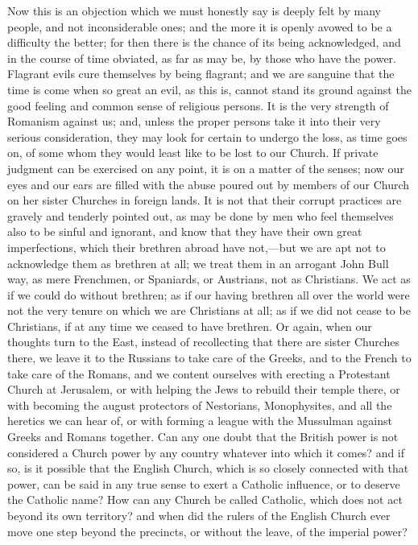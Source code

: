 Now this is an objection which we must honestly say is deeply felt
by many people, and not inconsiderable ones; and the more it is openly
avowed to be a difficulty the better; for then there is the chance of
its being acknowledged, and in the course of time obviated, as far as
may be, by those who have the power. Flagrant evils cure themselves by
being flagrant; and we are sanguine that the time is come when so
great an evil, as this is, cannot stand its ground against the good
feeling and common sense of religious persons. It is the very strength
of Romanism against us; and, unless the proper persons take it into
their very serious consideration, they may look for certain to undergo
the loss, as time goes on, of some whom they would least like to be
lost to our Church. If private judgment can be exercised on any point,
it is on a matter of the senses; now our eyes and our ears are filled
with the abuse poured out by members of our Church on her sister
Churches in foreign lands. It is not that their corrupt practices are
gravely and tenderly pointed out, as may be done by men who feel
themselves also to be sinful and ignorant, and know that they have
their own great imperfections, which their brethren abroad have not,—but
we are apt not to acknowledge them as brethren at all; we treat them
in an arrogant John Bull way, as mere Frenchmen, or Spaniards, or
Austrians, not as Christians. We act as if we could do without
brethren; as if our having brethren all over the world were not the
very tenure on which we are Christians at all; as if we did not cease
to be Christians, if at any time we ceased to have brethren. Or again,
when our thoughts turn to the East, instead of recollecting that there
are sister Churches there, we leave it to the Russians to take care of
the Greeks, and to the French to take care of the Romans, and we
content ourselves with erecting a Protestant Church at Jerusalem, or
with helping the Jews to rebuild their temple there, or with becoming
the august protectors of Nestorians, Monophysites, and all the
heretics we can hear of, or with forming a league with the Mussulman
against Greeks and Romans together. Can any one doubt that the British
power is not considered a Church power by any country whatever into
which it comes? and if so, is it possible that the English Church,
which is so closely connected with that power, can be said in any true
sense to exert a Catholic influence, or to deserve the Catholic name?
How can any Church be called Catholic, which does not act beyond its
own territory? and when did the rulers of the English Church ever move
one step beyond the precincts, or without the leave, of the imperial
power?

